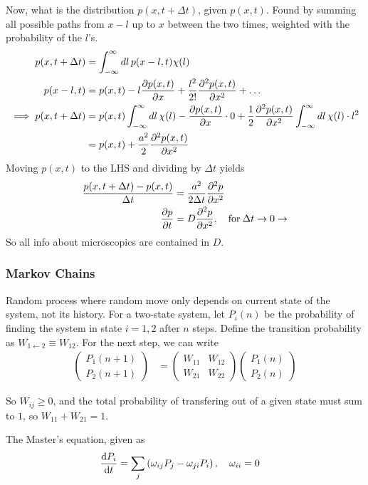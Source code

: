 \documentclass[a4paper, english, 12pt]{article}
\newcommand{\closed}[1]{\left( #1 \right)}
\begin{document}
\begin{multicols*}{2}
Now, what is the distribution $p(x,t+\Delta t)$, given $p(x,t)$. Found by summing all possible paths from $x-l$ up to $x$ between the two times, weighted with the probability of the $l$'s. 
\begin{align*}
    p(x,t+\Delta t) &= \int_{-\infty}^\infty dl\, p(x-l,t)\chi(l) \\ 
    p(x-l,t) &= p(x,t) - l \pdv{p(x,t)}{x} + \frac{l^2}{2!}\pdv[2]{p(x,t)}{x} + \dots \\ 
    \implies p(x,t+\Delta t) &= p(x,t)\int_{-\infty}^\infty dl\,\chi(l) - \pdv{p(x,t)}{x} \cdot 0 + \frac{1}{2} \pdv[2]{p(x,t)}{x} \int_{-\infty}^\infty dl\,\chi(l)\cdot l^2 \\ 
    &= p(x,t) + \frac{a^2}{2} \pdv[2]{p(x,t)}{x}
\end{align*}
Moving $p(x,t)$ to the LHS and dividing by $\Delta t$ yields 
\begin{align*}
    \frac{p(x,t+\Delta t) - p(x,t)}{\Delta t} &= \frac{a^2}{2\Delta t} \pdv[2]{p}{x} \\ 
    \pdv{p}{t} &= D \pdv[2]{p}{x},\quad \text{for}\: \Delta t \to 0 \to
\end{align*}
So all info about microscopics are contained in $D$. 



\subsubsection*{Markov Chains}
Random process where random move only depends on current state of the system, not its history. For a two-state system, let $P_i(n)$ be the probability of finding the system in state $i=1,2$ after $n$ steps. Define the transition probability as $W_{1\gets2}\equiv W_{12}$. For the next step, we can write 
\begin{align*}
    \begin{pmatrix}
        P_1 (n+1) \\
        P_2 (n+1)
    \end{pmatrix}
    &= \begin{pmatrix}
        W_{11} & W_{12} \\ 
        W_{21} & W_{22}
    \end{pmatrix}
    \begin{pmatrix}
        P_1 (n) \\
        P_2 (n)
    \end{pmatrix}
\end{align*}

So $W_{ij}\geq0$, and the total probability of transfering out of a given state must sum to $1$, so $W_{11}+W_{21}=1$. 


The Master's equation, given as 
\begin{align*}
    \dv{P_i}{t} &= \sum_{j} \closed{\omega_{ij}P_j - \omega_{ji}P_i},\quad \omega_{ii}=0
\end{align*}

\end{multicols*}
\end{document}
